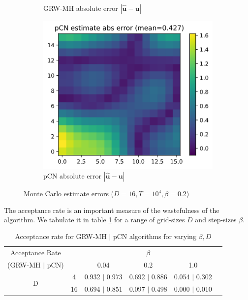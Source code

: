 \documentclass[]{article}
\newcommand{\ubold}{\boldsymbol{u}}
\begin{document}
\begin{figure}[!h]
\begin{subfigure}{0.32\linewidth}
		\caption{GRW-MH absolute error $|\hat{\ubold} - \ubold|$}
		\label{fig:grw-err}
	\end{subfigure}
	\begin{subfigure}{0.32\linewidth}
		\includegraphics[width=\linewidth]{pcn-err.png}
		\caption{pCN absolute error $|\hat{\ubold} - \ubold|$}
		\label{fig:pcn-err}
	\end{subfigure}
	\caption{Monte Carlo estimate errors ($D=16, T=10^4, \beta=0.2$)}
	\label{fig:abs-error}
\end{figure}

The acceptance rate is an important measure of the wastefulness of the algorithm. We tabulate it in table \ref{tab:acceptance} for a range of grid-sizes $D$ and step-sizes $\beta$.
%
\begin{table}[!h]
	\centering
	\begin{tabular}{cc | cccc}
		Acceptance Rate    &    & \multicolumn{3}{c}{$\beta$}                    &  \\
		(GRW-MH $|$ pCN)       &    & 0.04          & 0.2           & 1.0            &           \\ \hline
		\multirow{2}{*}{D} & 4  & 0.932 $|$ 0.973 & 0.692 $|$ 0.886 & 0.054 $|$ 0.302 &           \\
		& 16 &   0.694 $|$ 0.851      &  0.097  $|$ 0.498         &    0.000 $|$  0.010  & 
	\end{tabular}
\caption{Acceptance rate for GRW-MH $|$ pCN algorithms for varying $\beta, D$}
\label{tab:acceptance}
\end{table}
\end{document}

